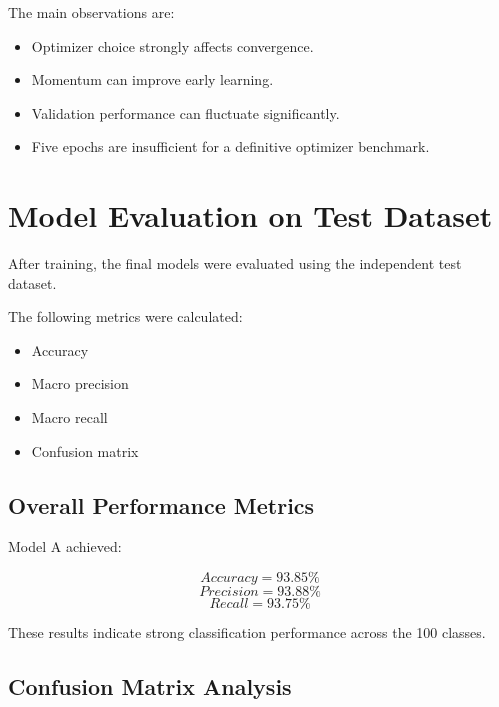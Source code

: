 \documentclass[12pt,a4paper]{report}
\begin{document}
The main observations are:

\begin{itemize}
    \item Optimizer choice strongly affects convergence.
    \item Momentum can improve early learning.
    \item Validation performance can fluctuate significantly.
    \item Five epochs are insufficient for a definitive optimizer
    benchmark.
\end{itemize}

\section{Model Evaluation on Test Dataset}

After training, the final models were evaluated using the
independent test dataset.

The following metrics were calculated:

\begin{itemize}
    \item Accuracy
    \item Macro precision
    \item Macro recall
    \item Confusion matrix
\end{itemize}

\subsection{Overall Performance Metrics}

Model A achieved:

\[
Accuracy=93.85\%
\]
\[
Precision=93.88\%
\]
\[
Recall=93.75\%
\]

These results indicate strong classification performance across
the 100 classes.

\subsection{Confusion Matrix Analysis}
\end{document}
